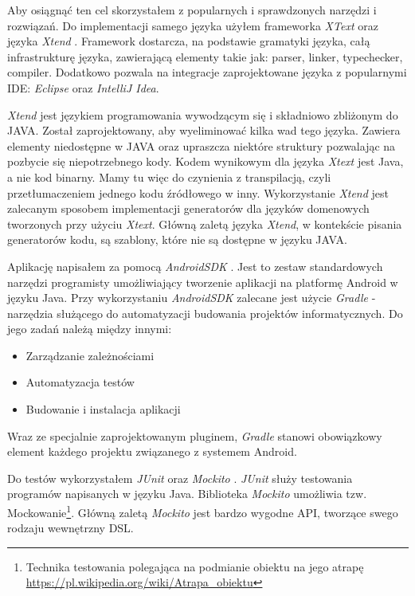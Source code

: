 \documentclass[openright]{xmgr}
\begin{document}
Aby osiągnąć ten cel skorzystałem z popularnych i sprawdzonych narzędzi i rozwiązań. Do implementacji samego języka użyłem frameworka \textit{XText} oraz języka \textit{Xtend} \cite{Xtend:2017:Doc}. Framework dostarcza, na podstawie gramatyki języka, całą infrastrukturę języka, zawierającą elementy takie jak: parser, linker, typechecker, compiler. Dodatkowo pozwala na integracje zaprojektowane języka z popularnymi IDE: \textit{Eclipse} oraz \textit{IntelliJ Idea}. 

\textit{Xtend} jest językiem programowania wywodzącym się i składniowo zbliżonym do JAVA. Został zaprojektowany, aby wyeliminować kilka wad tego języka. Zawiera elementy niedostępne w JAVA oraz upraszcza niektóre struktury pozwalając na pozbycie się niepotrzebnego kody. Kodem wynikowym dla języka \textit{Xtext} jest Java, a nie kod binarny. Mamy tu więc do czynienia z transpilacją, czyli przetłumaczeniem jednego kodu źródłowego w inny. Wykorzystanie \textit{Xtend} jest zalecanym sposobem implementacji generatorów dla języków domenowych tworzonych przy użyciu \textit{Xtext}. Główną zaletą języka \textit{Xtend}, w kontekście pisania generatorów kodu, są szablony, które nie są dostępne w języku JAVA.

Aplikację napisałem za pomocą \textit{AndroidSDK} \cite{AndroidSDK:2017:Doc}. Jest to zestaw standardowych narzędzi programisty umożliwiający tworzenie aplikacji na platformę Android w języku Java. Przy wykorzystaniu \textit{AndroidSDK} zalecane jest użycie \textit{Gradle} \cite{Gradle:2017:Doc} - narzędzia służącego do automatyzacji budowania projektów informatycznych. Do jego zadań należą między innymi:
\begin{itemize}
\item Zarządzanie zależnościami
\item Automatyzacja testów
\item Budowanie i instalacja aplikacji
\end{itemize}
Wraz ze specjalnie zaprojektowanym pluginem, \textit{Gradle} stanowi obowiązkowy element każdego projektu związanego z systemem Android.

Do testów wykorzystałem \textit{JUnit} \cite{JUnit:2017:Doc} oraz \textit{Mockito} \cite{Mockito:2017:Doc}. \textit{JUnit} służy testowania programów napisanych w języku Java. Biblioteka \textit{Mockito} umożliwia tzw. Mockowanie\footnote{Technika testowania polegająca na podmianie obiektu na jego atrapę \url{https://pl.wikipedia.org/wiki/Atrapa_obiektu}}.  Główną zaletą \textit{Mockito} jest bardzo wygodne API, tworzące swego rodzaju wewnętrzny DSL.
\end{document}
